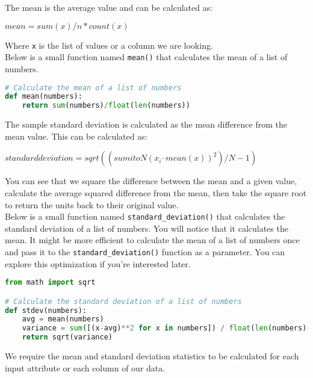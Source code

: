 \documentclass[12pt]{article}
\begin{document}
The mean is the average value and can be calculated as:\\

\begin{center}
	$ mean = sum(x)/n * count(x) $
\end{center}

Where \verb|x| is the list of values or a column we are looking.\\

Below is a small function named \verb|mean()| that calculates the mean of a list of numbers.

\begin{lstlisting}[language=python]
# Calculate the mean of a list of numbers
def mean(numbers):
	return sum(numbers)/float(len(numbers))

\end{lstlisting}

The sample standard deviation is calculated as the mean difference from the mean value. This can be calculated as:\\

\begin{center}
	$ standard deviation = sqrt((sum i to N (x_i – mean(x))^2) / N-1) $
\end{center}

You can see that we square the difference between the mean and a given value, calculate the average squared difference from the mean, then take the square root to return the units back to their original value.\\

Below is a small function named \verb|standard_deviation()| that calculates the standard deviation of a list of numbers. You will notice that it calculates the mean. It might be more efficient to calculate the mean of a list of numbers once and pass it to the \verb|standard_deviation()| function as a parameter. You can explore this optimization if you're interested later.

\newpage

\begin{lstlisting}[language=python]
from math import sqrt

# Calculate the standard deviation of a list of numbers
def stdev(numbers):
	avg = mean(numbers)
	variance = sum([(x-avg)**2 for x in numbers]) / float(len(numbers)-1)
	return sqrt(variance)

\end{lstlisting}

We require the mean and standard deviation statistics to be calculated for each input attribute or each column of our data.\\
\end{document}

